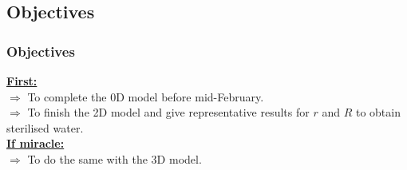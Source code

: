   \subsection{Objectives}
  \begin{frame}
  \frametitle{Objectives}
  \underline{\textbf{\color{blue}First:}}\\
  \vspace{5mm}
  $\Rightarrow$ To complete the 0D model before mid-February.\\
  \vspace{4mm}
  $\Rightarrow$ To finish the 2D model and give representative results for $r$ and $R$ to obtain sterilised water.\\
  \vspace{8mm}
  \underline{\textbf{\color{blue}If miracle:}}\\
  \vspace{5mm}
  $\Rightarrow$ To do the same with the 3D model.\end{frame}
